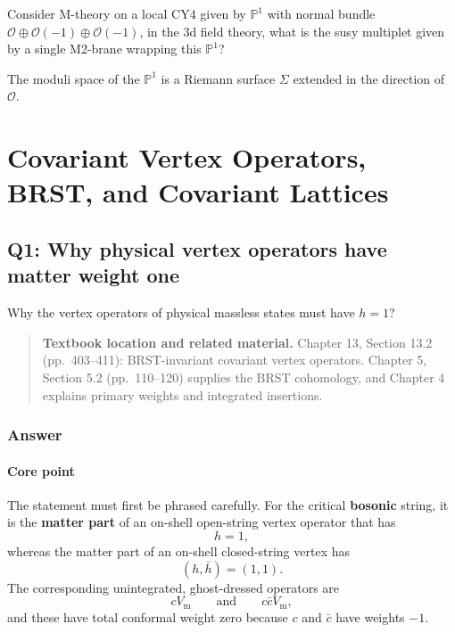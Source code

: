 \documentclass[
  10pt,
  a4paper,
  openany]{book}
\begin{document}
Consider M-theory on a local CY4 given by \(\mathbb{P}^1\) with normal
bundle \(\mathcal{O}\oplus \mathcal{O}(-1)\oplus \mathcal{O}(-1)\), in
the 3d field theory, what is the susy multiplet given by a single
M2-brane wrapping this \(\mathbb{P}^1\)?

The moduli space of the \(\mathbb{P}^1\) is a Riemann surface \(\Sigma\)
extended in the direction of \(\mathcal{O}\).

\chapter{Covariant Vertex Operators, BRST, and Covariant
Lattices}\label{covariant-vertex-operators-brst-and-covariant-lattices-1}

\section{Q1: Why physical vertex operators have matter weight
one}\label{q1-why-physical-vertex-operators-have-matter-weight-one}

Why the vertex operators of physical massless states must have \(h=1\)?

\begin{quote}
\textbf{Textbook location and related material.} Chapter 13, Section
13.2 (pp.~403--411): BRST-invariant covariant vertex operators. Chapter
5, Section 5.2 (pp.~110--120) supplies the BRST cohomology, and Chapter
4 explains primary weights and integrated insertions.
\end{quote}

\subsection{Answer}\label{answer-15}

\subsubsection{Core point}\label{core-point-15}

The statement must first be phrased carefully. For the critical
\textbf{bosonic} string, it is the \textbf{matter part} of an on-shell
open-string vertex operator that has \[
h=1,
\] whereas the matter part of an on-shell closed-string vertex has \[
(h,\bar h)=(1,1).
\] The corresponding unintegrated, ghost-dressed operators are \[
cV_{\mathrm m}
\qquad\text{and}\qquad
c\bar cV_{\mathrm m},
\] and these have total conformal weight zero because \(c\) and
\(\bar c\) have weights \(-1\).
\end{document}
